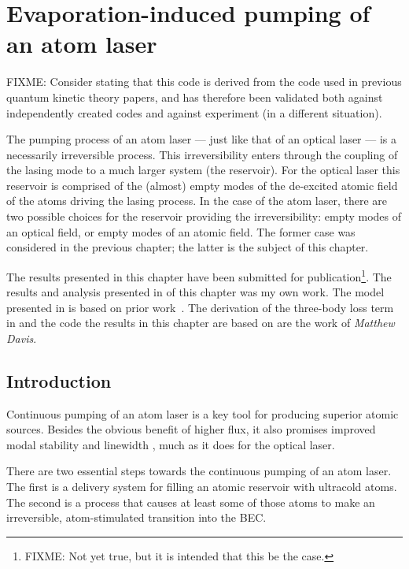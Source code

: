 \chapter{Evaporation-induced pumping of an atom laser}
\label{KineticTheory}
\graphicspath{{Figures/KineticTheory/}{Figures/Common/}}

FIXME: Consider stating that this code is derived from the code used in previous quantum kinetic theory papers, and has therefore been validated both against independently created codes and against experiment (in a different situation).

The pumping process of an atom laser --- just like that of an optical laser --- is a necessarily irreversible process. This irreversibility enters through the coupling of the lasing mode to a much larger system (the reservoir). For the optical laser this reservoir is comprised of the (almost) empty modes of the de-excited atomic field of the atoms driving the lasing process. In the case of the atom laser, there are two possible choices for the reservoir providing the irreversibility: empty modes of an optical field, or empty modes of an atomic field. The former case was considered in the previous chapter; the latter is the subject of this chapter. 

The results presented in this chapter have been submitted for publication\footnote{FIXME: Not yet true, but it is intended that this be the case.}.  The results and analysis presented in  of this chapter was my own work. The model presented in  is based on prior work~\citep{Davis:2000vn,Bijlsma:2000}. The derivation of the three-body loss term in  and the code the results in this chapter are based on are the work of \emph{Matthew Davis}.

\section{Introduction}

Continuous pumping of an atom laser is a key tool for producing superior atomic sources. Besides the obvious benefit of higher flux, it also promises improved modal stability \citep{Haine:2002kp,Haine:2003fs} and linewidth \citep{Johnsson:2007}, much as it does for the optical laser.

There are two essential steps towards the continuous pumping of an atom laser. The first is a delivery system for filling an atomic reservoir with ultracold atoms. The second is a process that causes at least some of those atoms to make an irreversible, atom-stimulated transition into the BEC.

